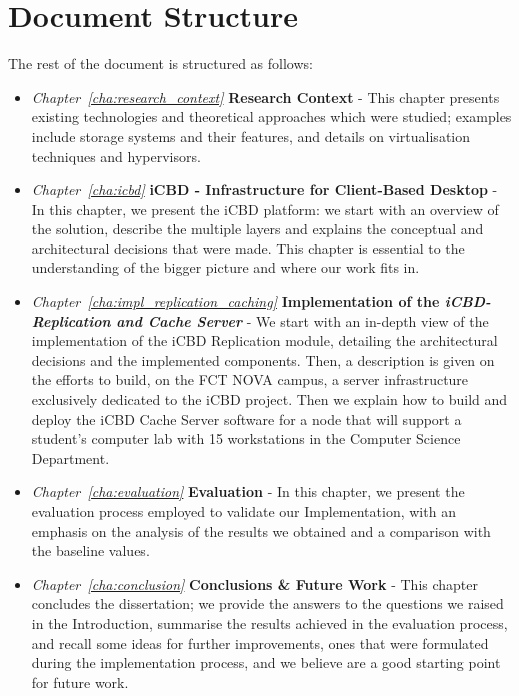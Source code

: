 \section{Document Structure} %
\label{sec:intro_document_structure}

The rest of the document is structured as follows:

\begin{itemize}
  \item \textit{Chapter~\ref{cha:research_context}}  \textbf{Research Context} - This chapter presents existing technologies and theoretical approaches which were studied; examples include storage systems and their features, and details on virtualisation techniques and hypervisors.
  \item \textit{Chapter~\ref{cha:icbd}} \textbf{iCBD - Infrastructure for Client-Based Desktop} - In this chapter, we present the iCBD platform: we start with an overview of the solution, describe the multiple layers and explains the conceptual and architectural decisions that were made. This chapter is essential to the understanding of the bigger picture and where our work fits in.
  \item \textit{Chapter~\ref{cha:impl_replication_caching}} \textbf{Implementation of the \textit{iCBD-Replication and Cache Server}} - We start with an in-depth view of the implementation of the iCBD Replication module, detailing the architectural decisions and the implemented components. Then, a description is given on the efforts to build, on the FCT NOVA campus, a server infrastructure exclusively dedicated to the iCBD project. Then we explain how to build and deploy the iCBD Cache Server software for a node that will support a student’s computer lab with 15 workstations in the Computer Science Department.
  \item \textit{Chapter~\ref{cha:evaluation}} \textbf{Evaluation} - In this chapter, we present the evaluation process employed to validate our Implementation, with an emphasis on the analysis of the results we obtained and a comparison with the baseline values.
  \item \textit{Chapter~\ref{cha:conclusion}} \textbf{Conclusions \& Future Work} - This chapter concludes the dissertation; we provide the answers to the questions we raised in the Introduction, summarise the results achieved in the evaluation process, and recall some ideas for further improvements, ones that were formulated during the implementation process, and we believe are a good starting point for future work.
\end{itemize}

